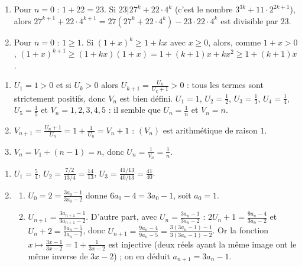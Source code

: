 \begin{corrige}
\begin{sol}
\begin{enumerate}
\item Pour $n = 0$ : $1 + 22 = 23$. Si $23 | 27^k + 22 \cdot 4^k$ (c'est le nombre $3^{3k} + 11 \cdot 2^{2k+1}$), alors
      $27^{k+1} + 22 \cdot 4^{k+1} = 27 (27^k + 22 \cdot 4^k) - 23 \cdot 22 \cdot 4^k$ est divisible par $23$.
\item Pour $n = 0$ : $1 \geq 1$. Si $(1+x)^k \geq 1 + kx$ avec $x \geq 0$, alors, comme $1 + x > 0$,
      $(1+x)^{k+1} \geq (1 + kx)(1 + x) = 1 + (k+1)x + kx^2 \geq 1 + (k+1)x$.
\end{enumerate}
\end{sol}
%
\begin{sol}
\begin{enumerate}
\item $U_1 = 1 > 0$ et si $U_k > 0$ alors $U_{k+1} = \frac{U_k}{U_k + 1} > 0$ : tous les termes sont strictement positifs, donc $V_n$ est bien d\'efini.
      $U_1 = 1$, $U_2 = \frac{1}{2}$, $U_3 = \frac{1}{3}$, $U_4 = \frac{1}{4}$, $U_5 = \frac{1}{5}$ et $V_n = 1, 2, 3, 4, 5$ :
      il semble que $U_n = \frac{1}{n}$ et $V_n = n$.
\item $V_{n+1} = \frac{U_n + 1}{U_n} = 1 + \frac{1}{U_n} = V_n + 1$ : $(V_n)$ est arithm\'etique de raison $1$.
\item $V_n = V_1 + (n - 1) = n$, donc $U_n = \frac{1}{V_n} = \frac{1}{n}$.
\end{enumerate}
\end{sol}
%
\begin{sol}
\begin{enumerate}
\item $U_1 = \frac{5}{4}$, $U_2 = \frac{7/2}{13/4} = \frac{14}{13}$, $U_3 = \frac{41/13}{40/13} = \frac{41}{40}$.
\item \begin{enumerate}
      \item $U_0 = 2 = \frac{3a_0 - 1}{3a_0 - 2}$ donne $6a_0 - 4 = 3a_0 - 1$, soit $a_0 = 1$.
      \item $U_{n+1} = \frac{3a_{n+1} - 1}{3a_{n+1} - 2}$. D'autre part, avec $U_n = \frac{3a_n - 1}{3a_n - 2}$ :
            $2U_n + 1 = \frac{9a_n - 4}{3a_n - 2}$ et $U_n + 2 = \frac{9a_n - 5}{3a_n - 2}$, donc
            $U_{n+1} = \frac{9a_n - 4}{9a_n - 5} = \frac{3(3a_n - 1) - 1}{3(3a_n - 1) - 2}$.
            Or la fonction $x \mapsto \frac{3x - 1}{3x - 2} = 1 + \frac{1}{3x - 2}$ est injective (deux r\'eels ayant la m\^eme image
            ont le m\^eme inverse de $3x - 2$) ; on en d\'eduit $a_{n+1} = 3a_n - 1$.
      \end{enumerate}

\end{enumerate}
\end{sol}
\end{corrige}

